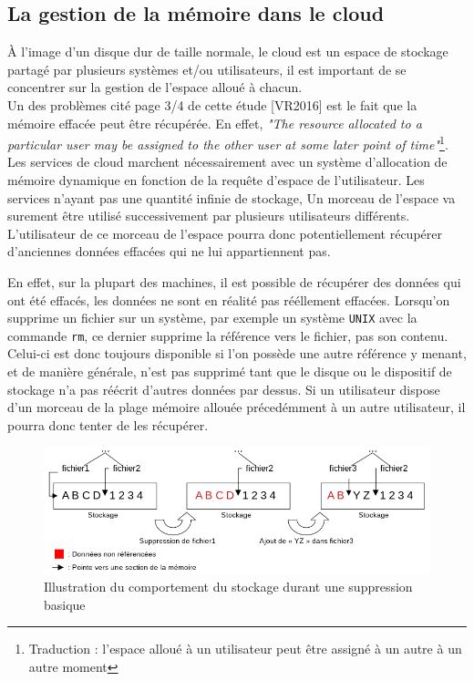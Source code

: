 \documentclass[a4paper, 12pt]{article}
\begin{document}
    \subsection{La gestion de la mémoire dans le cloud}
      À l'image d'un disque dur de taille normale, le cloud est un espace de
      stockage partagé par plusieurs systèmes et/ou utilisateurs, il est
      important de se concentrer sur la gestion de l'espace alloué à chacun. \\

      Un des problèmes cité page 3/4 de cette étude [VR2016] est le fait que la
      mémoire effacée peut être récupérée. En effet, \textit{"The resource
      allocated to a particular user may be assigned to the other user at some
      later point of time"}\footnote{Traduction : l'espace alloué à un
      utilisateur peut être assigné à un autre à un autre moment}. Les services
      de cloud marchent nécessairement avec un système d'allocation de mémoire
      dynamique en fonction de la requête d'espace de l'utilisateur. Les
      services n'ayant pas une quantité infinie de stockage, Un morceau de
      l'espace va surement être utilisé successivement par plusieurs
      utilisateurs différents. L'utilisateur de ce morceau de l'espace pourra
      donc potentiellement récupérer d'anciennes données effacées qui ne lui
      appartiennent pas.

      En effet, sur la plupart des machines, il est possible de récupérer des
      données qui ont été effacés, les données ne sont en réalité pas rééllement
      effacées. Lorsqu'on supprime un fichier sur un système, par exemple un
      système \verb+UNIX+ avec la commande \verb+rm+, ce dernier supprime la
      référence vers le fichier, pas son contenu. Celui-ci est donc toujours
      disponible si l'on possède une autre référence y menant, et de manière
      générale, n'est pas supprimé tant que le disque ou le dispositif de
      stockage n'a pas réécrit d'autres données par dessus. Si un utilisateur
      dispose d'un morceau de la plage mémoire allouée précedémment à un autre
      utilisateur, il pourra donc tenter de les récupérer.

      \begin{figure}[h]
        \centering
        \includegraphics[scale=.6]{img/schema_memoire.png}
        \caption{Illustration du comportement du stockage durant une suppression
        basique}
      \end{figure}
\end{document}
